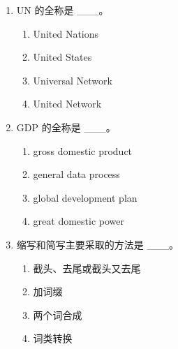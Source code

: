 \documentclass[11pt,a4paper]{ctexart}
\begin{document}
\begin{enumerate}[leftmargin=*,itemsep=4pt]
\begin{enumerate}[label=\Alph*.,leftmargin=2em,itemsep=1pt,topsep=2pt]
\end{enumerate}
\item UN 的全称是 \_\_\_。
\begin{enumerate}[label=\Alph*.,leftmargin=2em,itemsep=1pt,topsep=2pt]
\item United Nations
\item United States
\item Universal Network
\item United Network
\end{enumerate}
\item GDP 的全称是 \_\_\_。
\begin{enumerate}[label=\Alph*.,leftmargin=2em,itemsep=1pt,topsep=2pt]
\item gross domestic product
\item general data process
\item global development plan
\item great domestic power
\end{enumerate}
\item 缩写和简写主要采取的方法是 \_\_\_。
\begin{enumerate}[label=\Alph*.,leftmargin=2em,itemsep=1pt,topsep=2pt]
\item 截头、去尾或截头又去尾
\item 加词缀
\item 两个词合成
\item 词类转换
\end{enumerate}
\end{enumerate}

\newpage
\end{document}
